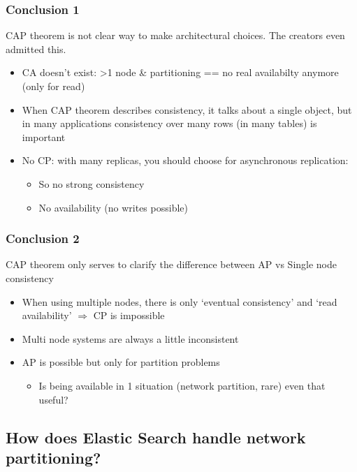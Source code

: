 \documentclass{article}
\begin{document}
\subsubsection{Conclusion 1}

CAP theorem is not clear way to make architectural choices. The creators even admitted this.

\begin{itemize}
    \item CA doesn't exist: >1 node \& partitioning == no real availabilty anymore (only for read)
    \item When CAP theorem describes consistency, it talks about a single object, but in many applications consistency over many rows (in many tables) is important
    \item No CP: with many replicas, you should choose for asynchronous replication:
    \begin{itemize}
        \item So no strong consistency
        \item No availability (no writes possible)
    \end{itemize}
\end{itemize}

\subsubsection{Conclusion 2}

CAP theorem only serves to clarify the difference between AP vs Single node consistency

\begin{itemize}
    \item When using multiple nodes, there is only `eventual consistency' and `read availability' $\Rightarrow$ CP is impossible
    \item Multi node systems are always a little inconsistent
    \item AP is possible but only for partition problems
    \begin{itemize}
        \item Is being available in 1 situation (network partition, rare) even that useful?
    \end{itemize}
\end{itemize}

\subsection{How does Elastic Search handle network partitioning?}
\end{document}
